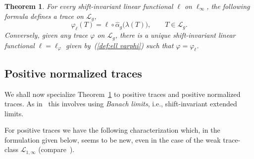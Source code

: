 \documentclass[10pt, a4paper]{amsart}
\newcommand{\sL}{\mathscr{L}}
\numberwithin{equation}{section}
\newtheorem{theorem}{Theorem}[section]
\theoremstyle{definition}
\theoremstyle{remark}
\begin{document}
\begin{theorem}\label{thm:Pietsch.Spectral}
 For every shift-invariant linear functional $\ell$ on $\ell_\infty$, the following formula defines a trace on $\sL_g$,
 \begin{equation}\label{eq:final Lidskii}
  \varphi_\ell(T)= \ell\circ \hat{\alpha}_g\big( \lambda(T)\big),  \qquad T\in \sL_g.
\end{equation}
Conversely, given any trace $\varphi$ on $\sL_g$, there is a unique shift-invariant linear functional $\ell=\ell_\varphi$ given by~(\ref{def:ell varphi}) such that $\varphi=\varphi_\ell$.
\end{theorem}

\subsection{Positive normalized traces}
We shall now specialize Theorem~\ref{thm:Pietsch.Spectral} to positive traces and positive normalized traces. As in~\cite{SSUZ:AIM15, LSZ:Book} this involves using \emph{Banach limits}, i.e., shift-invariant extended limits.

For positive traces we have the following characterization which, in the formulation given below, seems to be new, even in the case of the weak trace-class $\sL_{1,\infty}$ (compare~\cite[Theorem~6.3.1(d)]{LSZ:Book}).
\end{document}
